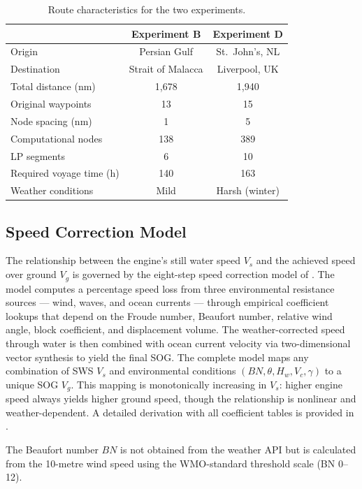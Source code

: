 \documentclass[review]{elsarticle}
\begin{document}
\begin{table}[htbp]
\centering
\caption{Route characteristics for the two experiments.}
\label{tab:routes}
\begin{tabular}{lcc}
\toprule
 & Experiment B & Experiment D \\
\midrule
Origin & Persian Gulf & St.\ John's, NL \\
Destination & Strait of Malacca & Liverpool, UK \\
Total distance (nm) & 1,678 & 1,940 \\
Original waypoints & 13 & 15 \\
Node spacing (nm) & 1 & 5 \\
Computational nodes & 138 & 389 \\
LP segments & 6 & 10 \\
Required voyage time (h) & 140 & 163 \\
Weather conditions & Mild & Harsh (winter) \\
\bottomrule
\end{tabular}
\end{table}


\subsection{Speed Correction Model}
\label{sec:speed-model}

The relationship between the engine's still water speed $V_s$ and the achieved speed over ground $V_g$ is governed by the eight-step speed correction model of \cite{Yang2020}. The model computes a percentage speed loss from three environmental resistance sources --- wind, waves, and ocean currents --- through empirical coefficient lookups that depend on the Froude number, Beaufort number, relative wind angle, block coefficient, and displacement volume. The weather-corrected speed through water is then combined with ocean current velocity via two-dimensional vector synthesis to yield the final SOG. The complete model maps any combination of SWS $V_s$ and environmental conditions $(BN, \theta, H_w, V_c, \gamma)$ to a unique SOG $V_g$. This mapping is monotonically increasing in $V_s$: higher engine speed always yields higher ground speed, though the relationship is nonlinear and weather-dependent. A detailed derivation with all coefficient tables is provided in \cite{Yang2020}.

The Beaufort number $BN$ is not obtained from the weather API but is calculated from the 10-metre wind speed using the WMO-standard threshold scale (BN 0--12).
\end{document}
